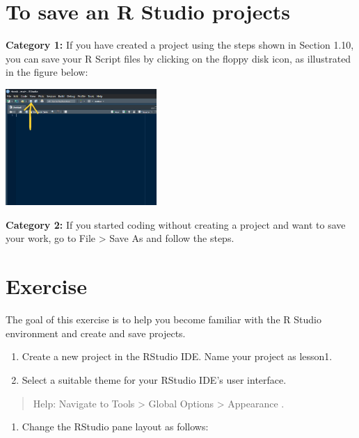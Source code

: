 \documentclass[
  letterpaper,
  DIV=11,
  numbers=noendperiod]{scrreprt}
\providecommand{\tightlist}{%
  \setlength{\itemsep}{0pt}\setlength{\parskip}{0pt}}\usepackage{longtable,booktabs,array}
\begin{document}
\section{To save an R Studio
projects}\label{to-save-an-r-studio-projects}

\textbf{Category 1:} If you have created a project using the steps shown
in Section 1.10, you can save your R Script files by clicking on the
floppy disk icon, as illustrated in the figure below:

\includegraphics[width=2.26in,height=\textheight,keepaspectratio]{img/chap1/rw13.png}

\textbf{Category 2:} If you started coding without creating a project
and want to save your work, go to File \textgreater{} Save As and follow
the steps.

\section{Exercise}\label{exercise}

The goal of this exercise is to help you become familiar with the R
Studio environment and create and save projects.

\begin{enumerate}
\def\labelenumi{\arabic{enumi}.}
\item
  Create a new project in the RStudio IDE. Name your project as lesson1.
\item
  Select a suitable theme for your RStudio IDE's user interface.
\end{enumerate}

\begin{quote}
Help: Navigate to Tools \textgreater{} Global Options \textgreater{}
Appearance .
\end{quote}

\begin{enumerate}
\def\labelenumi{\arabic{enumi}.}
\setcounter{enumi}{2}
\tightlist
\item
  Change the RStudio pane layout as follows:
\end{enumerate}
\end{document}
